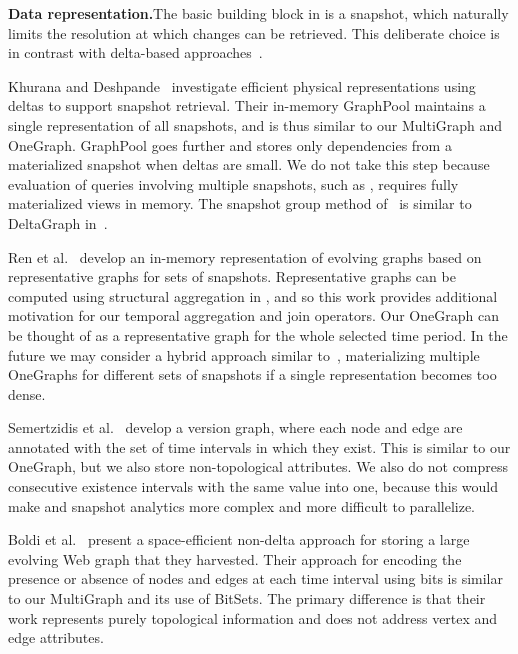 
{\bf Data representation.}The basic building block in \ql is a snapshot,
which naturally limits the resolution at which changes can be
retrieved. This deliberate choice is in contrast with delta-based
approaches~\cite{Khurana2013,Koloniari2012,DBLP:journals/tos/MiaoHLWYZPCC15}.

Khurana and Deshpande~\cite{Khurana2013} investigate efficient
physical representations using deltas to support snapshot retrieval.
Their in-memory GraphPool maintains a single representation of all
snapshots, and is thus similar to our MultiGraph and OneGraph.
GraphPool goes further and stores only dependencies from a
materialized snapshot when deltas are small.  We do not take
this step because evaluation of queries involving multiple snapshots,
such as , requires fully materialized views in memory.
The snapshot group method of~\cite{DBLP:journals/tos/MiaoHLWYZPCC15}
is similar to DeltaGraph in~\cite{Khurana2013}.

Ren et al.~\cite{Ren2011} develop an in-memory representation of
evolving graphs based on representative graphs for sets of snapshots.
Representative graphs can be computed using structural aggregation in
\ql, and so this work provides additional motivation for our temporal
aggregation and join operators.  Our OneGraph can be thought of as a
representative graph for the whole selected time period.  In the
future we may consider a hybrid approach similar to~\cite{Ren2011},
materializing multiple OneGraphs for different sets of snapshots if a
single representation becomes too dense.

Semertzidis et al.~\cite{Semertzidis2015} develop a version graph,
where each node and edge are annotated with the set of time intervals
in which they exist.  This is similar to our OneGraph, but we also
store non-topological attributes.  We also do not compress consecutive
existence intervals with the same value into one, because this would
make  and snapshot analytics more complex and more
difficult to parallelize.

Boldi et al.~\cite{Boldi2008} present a space-efficient non-delta
approach for storing a large evolving Web graph that they harvested.
Their approach for encoding the presence or absence of nodes and edges
at each time interval using bits is similar to our MultiGraph and its
use of BitSets.  The primary difference is that their work represents
purely topological information and does not address vertex and edge
attributes.

